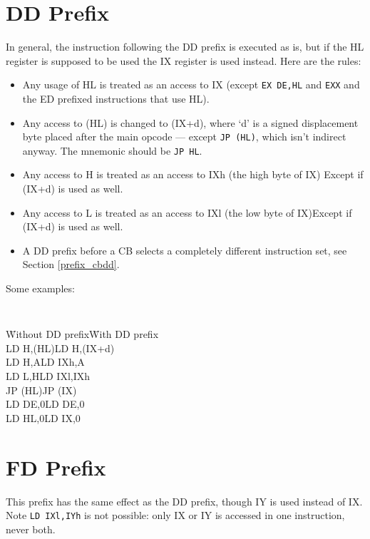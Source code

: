 \documentclass[oneside,a4paper]{book}
\begin{document}
\section{DD Prefix \cite{gerton}}

In general, the instruction following the DD prefix is executed as is, but if the HL register is supposed to be used the IX register is used instead. Here are the rules:

\begin{itemize}
	\item Any usage of HL is treated as an access to IX (except {\tt EX DE,HL} and {\tt EXX} and the ED prefixed instructions that use HL).
	
	\item Any access to (HL) is changed to (IX+d), where `d' is a signed displacement byte placed after the main opcode --- except {\tt JP (HL)}, which isn't indirect anyway. The mnemonic should be {\tt JP HL}.
	
	\item Any access to H is treated as an access to IXh (the high byte of IX)
	Except if (IX+d) is used as well.
	
	\item Any access to L is treated as an access to IXl (the low byte of IX)Except if (IX+d) is used as well.
	
	\item A DD prefix before a CB selects a completely different instruction set, see Section {\ref{prefix_cbdd}}.
\end{itemize}

Some examples:

{\tt
	\begin{tabbing}
		{\qquad}\={\rm Without DD prefix}\qquad\={\rm With DD prefix}\+ \\
		LD H,(HL)\>LD H,(IX+d)\\
		LD H,A\>LD IXh,A\\
		LD L,H\>LD IXl,IXh\\
		JP (HL)\>JP (IX)\\
		LD DE,0\>LD DE,0\\
		LD HL,0\>LD IX,0\\
	\end{tabbing}
}


\section{FD Prefix \cite{gerton}}

This prefix has the same effect as the DD prefix, though IY is used instead of IX.  Note {\tt LD IXl,IYh} is not possible: only IX or IY is accessed in one instruction, never both.
\end{document}
